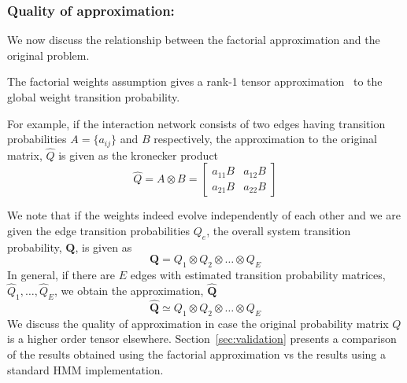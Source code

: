 \documentclass{bioinfo}
\begin{document}
\begin{methods}

\subsubsection{Quality of approximation:} We now discuss the
relationship between the factorial approximation and the original problem.  
\begin{lemma}
The factorial weights assumption gives a rank-1 tensor approximation~\citep{Horn90}  to the global weight
transition probability.  
\end{lemma}
For example, if the interaction network consists of two edges having transition
probabilities $A = \{a_{ij}\}$
and $B$ respectively, the approximation to
the original matrix, $\hat{Q}$ is given as the kronecker product
\[ \hat{Q} = A \otimes B = \left[
  \begin{array}{cc}
    a_{11} B & a_{12} B \\
    a_{21} B & a_{22} B
  \end{array}
\right]
\]

We note that if the weights indeed evolve independently of each other
and we are given the edge transition probabilities
$Q_{e}$, the overall system transition probability, $\mathbf{Q}$, is
given as 
\[
\mathbf{Q} = Q_{1} \otimes Q_{2} \otimes \ldots \otimes Q_{E}
\]
In general, if there are $E$ edges with estimated transition
probability matrices, $\hat{Q}_{1}, \ldots, \hat{Q}_{E}$, we obtain the approximation, $\hat{\mathbf{Q}}$
\[
\hat{\mathbf{Q}} \simeq Q_{1} \otimes Q_{2} \otimes \ldots \otimes Q_{E}
\]
We discuss the quality of approximation in case the original
probability matrix $Q$ is a higher order tensor
elsewhere. Section~\ref{sec:validation} presents a comparison of
the results obtained using the factorial approximation 
vs the results using a standard HMM implementation. 


\end{methods}
\end{document}
